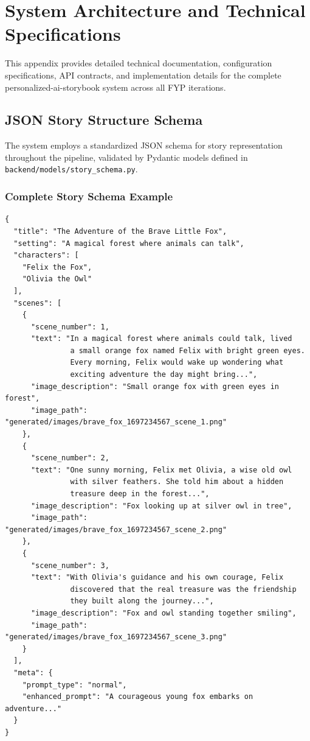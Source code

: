 \chapter{System Architecture and Technical Specifications}
\label{appendix:technical-specs}

This appendix provides detailed technical documentation, configuration specifications, API contracts, and implementation details for the complete personalized-ai-storybook system across all FYP iterations.

\section{JSON Story Structure Schema}
The system employs a standardized JSON schema for story representation throughout the pipeline, validated by Pydantic models defined in \texttt{backend/models/story\_schema.py}.

\subsection{Complete Story Schema Example}
\begin{verbatim}
{
  "title": "The Adventure of the Brave Little Fox",
  "setting": "A magical forest where animals can talk",
  "characters": [
    "Felix the Fox",
    "Olivia the Owl"
  ],
  "scenes": [
    {
      "scene_number": 1,
      "text": "In a magical forest where animals could talk, lived
               a small orange fox named Felix with bright green eyes.
               Every morning, Felix would wake up wondering what
               exciting adventure the day might bring...",
      "image_description": "Small orange fox with green eyes in forest",
      "image_path": "generated/images/brave_fox_1697234567_scene_1.png"
    },
    {
      "scene_number": 2,
      "text": "One sunny morning, Felix met Olivia, a wise old owl
               with silver feathers. She told him about a hidden
               treasure deep in the forest...",
      "image_description": "Fox looking up at silver owl in tree",
      "image_path": "generated/images/brave_fox_1697234567_scene_2.png"
    },
    {
      "scene_number": 3,
      "text": "With Olivia's guidance and his own courage, Felix
               discovered that the real treasure was the friendship
               they built along the journey...",
      "image_description": "Fox and owl standing together smiling",
      "image_path": "generated/images/brave_fox_1697234567_scene_3.png"
    }
  ],
  "meta": {
    "prompt_type": "normal",
    "enhanced_prompt": "A courageous young fox embarks on adventure..."
  }
}
\end{verbatim}

